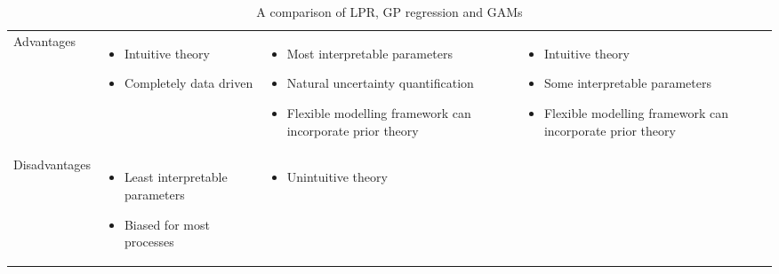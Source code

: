 \documentclass[man, floatsintext]{apa7}
\begin{document}
\begin{table}[htbp]
  \begin{center}
    \begin{threeparttable}
      \caption{A comparison of LPR, GP regression and GAMs}
      \label{tab:meth_sum}

      \begin{tabularx}{\linewidth}
        {>{\raggedright}s
          >{\raggedright}X
          >{\raggedright}X
          >{\raggedright\arraybackslash}X}
        \toprule
                                                                        &
                                                 &
                                                  &
        \\
        \midrule
        Advantages                                                      &
        \begin{itemize}
          \item Intuitive theory
          \item Completely data driven
        \end{itemize}                                    &
        \begin{itemize}
          \item Most interpretable parameters
          \item Natural uncertainty quantification
          \item Flexible modelling framework can incorporate prior theory
        \end{itemize} &
        \begin{itemize}
          \item Intuitive theory
          \item Some interpretable parameters
          \item Flexible modelling framework can incorporate prior theory
        \end{itemize}
        \\ \midrule
        Disadvantages                                                   &
        \begin{itemize}
          \item Least interpretable parameters
          \item Biased for most processes
        \end{itemize}                            &
        \begin{itemize}
          \item Unintuitive theory

\end{itemize}
\end{tabularx}
\end{threeparttable}
\end{center}
\end{table}
\end{document}
